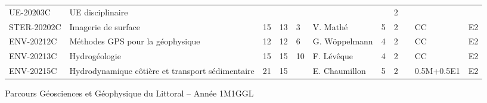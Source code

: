 \documentclass[a4paper,11pt]{article}
\begin{document}
{{\begin{tabular}{lllllllllll}
\rowcolor[HTML]{C0C0C0} 
UE-20203C                      & UE disciplinaire                                                                          &                           &                           &                           &                                    &                             & 2                           &                                    &                                  &                                  \\
STER-20202C                    & Imagerie de surface                                                                       & 15                        & 13                        & 3                         & V. Mathé                           & 5                           & 2                           &                                    & CC                               & E2                               \\
ENV-20212C                     & Méthodes GPS pour la géophysique                                                          & 12                        & 12                        & 6                         & G. Wöppelmann                      & 4                           & 2                           &                                    & CC                               & E2                               \\
ENV-20213C                     & Hydrogéologie                                                                             & 15                        & 15                        & 10                        & F. Lévêque                         & 4                           & 2                           &                                    & CC                               & E2                               \\
ENV-20215C                     & Hydrodynamique côtière et transport sédimentaire                                          & 21                        & 15                        &                           & E. Chaumillon                      & 5                           & 2                           &                                    & 0.5M+0.5E1                       & E2                              
\end{tabular}}
}{Parcours Géosciences et Géophysique du Littoral -- Année 1}{M1GGL}
\end{document}
